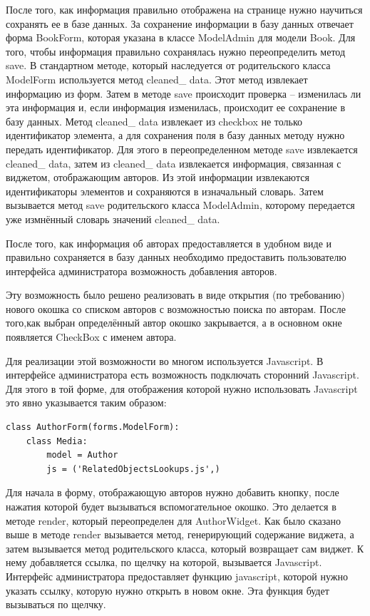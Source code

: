 \documentclass[a4paper]{report}
\begin{document}
После того, как информация правильно отображена на странице нужно научиться сохранять ее в базе данных. За сохранение  информации в базу данных отвечает форма BookForm, которая указана в классе ModelAdmin для модели Book. Для того, чтобы информация правильно сохранялась нужно переопределить метод save. В стандартном методе, который наследуется от родительского класса ModelForm используется метод cleaned\_ data. Этот метод извлекает информацию из форм. Затем в методе save происходит проверка -- изменилась ли эта информация и, если информация изменилась, происходит ее сохранение в базу данных. Метод cleaned\_ data извлекает из checkbox не только идентификатор элемента, а для сохранения поля в базу данных методу нужно передать идентификатор. Для этого в переопределенном методе save извлекается cleaned\_ data, затем из cleaned\_ data извлекается информация, связанная с виджетом, отображающим авторов. Из этой информации извлекаются идентификаторы элементов и сохраняются в изначальный словарь. Затем вызывается метод save родительского класса ModelAdmin, которому передается уже измнённый словарь значений cleaned\_ data. 

После того, как информация об авторах предоставляется в удобном виде и правильно сохраняется в базу данных необходимо предоставить пользователю интерфейса администратора возможность добавления авторов. 

Эту возможность было решено реализовать в виде открытия (по требованию) нового окошка со списком авторов с возможностью поиска по авторам. После того,как выбран определённый автор окошко закрывается, а в основном окне появляется CheckBox с именем автора. 

Для реализации этой возможности во многом используется Javascript. В интерфейсе администратора есть возможность подключать сторонний Javascript. Для этого в той форме, для отображения которой нужно использовать Javascript это явно указывается таким образом:

\begin{verbatim}
class AuthorForm(forms.ModelForm):
    class Media:
    	model = Author
        js = ('RelatedObjectsLookups.js',)

\end{verbatim}

Для начала в форму, отображающую авторов нужно добавить кнопку, после нажатия которой будет вызываться вспомогательное окошко. Это делается в методе render, который переопределен для AuthorWidget. Как было сказано выше в методе render вызывается метод, генерирующий содержание виджета, а затем вызывается метод родительского класса, который возвращает сам виджет. К нему добавляется ссылка, по щелчку на которой, вызывается Javascript. Интерфейс администратора предоставляет функцию javascript, которой нужно указать ссылку, которую нужно открыть в новом окне. Эта функция будет вызываться по щелчку. 
\end{document}
